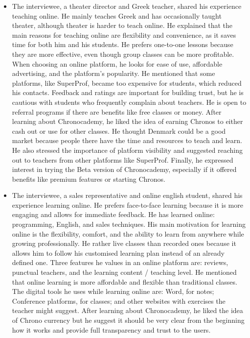 \begin{itemize}
    \item The interviewee, a theater director and Greek teacher, shared his experience teaching online.
    He mainly teaches Greek and has occasionally taught theater, although theater is harder to teach online.
    He explained that the main reasons for teaching online are flexibility and convenience, as it saves time for both him and his students.
    He prefers one-to-one lessons because they are more effective, even though group classes can be more profitable.
    When choosing an online platform, he looks for ease of use, affordable advertising, and the platform’s popularity.
    He mentioned that some platforms, like SuperProf, became too expensive for students, which reduced his contacts.
    Feedback and ratings are important for building trust, but he is cautious with students who frequently complain about teachers.
    He is open to referral programs if there are benefits like free classes or money.
    After learning about Chronocademy, he liked the idea of earning Chronos to either cash out or use for other classes.
    He thought Denmark could be a good market because people there have the time and resources to teach and learn.
    He also stressed the importance of platform visibility and suggested reaching out to teachers from other platforms like SuperProf.
    Finally, he expressed interest in trying the Beta version of Chronocademy, especially if it offered benefits like premium features or starting Chronos.
    \item The interviewee, a sales representative and online english student, shared his experience learning online.
    He prefers face-to-face learning because it is more engaging and allows for immediate feedback.
    He has learned online: programming, English, and sales techniques.
    His main motivation for learning online is the flexibility, comfort, and the ability to learn from anywhere while growing professionally.
    He rather live classes than recorded ones because it allows him to follow his customised learning plan instead of an already defined one.
    Three features he values in an online platform are: reviews, punctual teachers, and the learning content / teaching level.
    He mentioned that online learning is more affordable and flexible than traditional classes.
    The digital tools he uses while learning online are: Word, for notes; Conference platforms, for classes; and other websites with exercises the teacher might suggest.
    After learning about Chronocademy, he liked the idea of Chrono currency but he suggest it should be very clear from the beginning how it works and provide full transparency and trust to the users.

\end{itemize}
